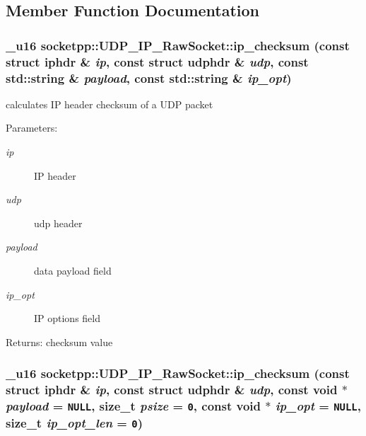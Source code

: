 \subsection{Member Function Documentation}
\hypertarget{classsocketpp_1_1UDP__IP__RawSocket_6af969961a1dbe17e2da9f26dce18463}{
\subsubsection[{ip\_\-checksum}]{\setlength{\rightskip}{0pt plus 5cm}\_\-u16 socketpp::UDP\_\-IP\_\-RawSocket::ip\_\-checksum (const struct iphdr \& {\em ip}, \/  const struct udphdr \& {\em udp}, \/  const std::string \& {\em payload}, \/  const std::string \& {\em ip\_\-opt})}}
\label{classsocketpp_1_1UDP__IP__RawSocket_6af969961a1dbe17e2da9f26dce18463}


calculates IP header checksum of a UDP packet 

\begin{Desc}
\item[Parameters:]
\begin{description}
\item[{\em ip}]IP header \item[{\em udp}]udp header \item[{\em payload}]data payload field \item[{\em ip\_\-opt}]IP options field \end{description}
\end{Desc}
\begin{Desc}
\item[Returns:]checksum value \end{Desc}
\hypertarget{classsocketpp_1_1UDP__IP__RawSocket_23e1e3f2f4b206d88b6c8ca4e0b514fd}{
\subsubsection[{ip\_\-checksum}]{\setlength{\rightskip}{0pt plus 5cm}\_\-u16 socketpp::UDP\_\-IP\_\-RawSocket::ip\_\-checksum (const struct iphdr \& {\em ip}, \/  const struct udphdr \& {\em udp}, \/  const void $\ast$ {\em payload} = {\tt NULL}, \/  size\_\-t {\em psize} = {\tt 0}, \/  const void $\ast$ {\em ip\_\-opt} = {\tt NULL}, \/  size\_\-t {\em ip\_\-opt\_\-len} = {\tt 0})}}
\label{classsocketpp_1_1UDP__IP__RawSocket_23e1e3f2f4b206d88b6c8ca4e0b514fd}


